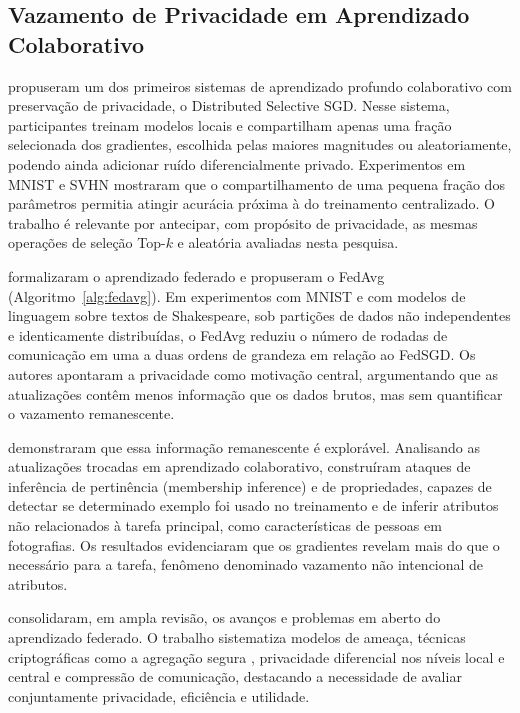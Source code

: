\subsection{Vazamento de Privacidade em Aprendizado Colaborativo}

 propuseram um dos primeiros sistemas de aprendizado profundo colaborativo com preservação de privacidade, o Distributed Selective SGD. Nesse sistema, participantes treinam modelos locais e compartilham apenas uma fração selecionada dos gradientes, escolhida pelas maiores magnitudes ou aleatoriamente, podendo ainda adicionar ruído diferencialmente privado. Experimentos em MNIST e SVHN mostraram que o compartilhamento de uma pequena fração dos parâmetros permitia atingir acurácia próxima à do treinamento centralizado. O trabalho é relevante por antecipar, com propósito de privacidade, as mesmas operações de seleção Top-$k$ e aleatória avaliadas nesta pesquisa.

 formalizaram o aprendizado federado e propuseram o FedAvg (Algoritmo~\ref{alg:fedavg}). Em experimentos com MNIST e com modelos de linguagem sobre textos de Shakespeare, sob partições de dados não independentes e identicamente distribuídas, o FedAvg reduziu o número de rodadas de comunicação em uma a duas ordens de grandeza em relação ao FedSGD. Os autores apontaram a privacidade como motivação central, argumentando que as atualizações contêm menos informação que os dados brutos, mas sem quantificar o vazamento remanescente.

 demonstraram que essa informação remanescente é explorável. Analisando as atualizações trocadas em aprendizado colaborativo, construíram ataques de inferência de pertinência (membership inference) e de propriedades, capazes de detectar se determinado exemplo foi usado no treinamento e de inferir atributos não relacionados à tarefa principal, como características de pessoas em fotografias. Os resultados evidenciaram que os gradientes revelam mais do que o necessário para a tarefa, fenômeno denominado vazamento não intencional de atributos.

 consolidaram, em ampla revisão, os avanços e problemas em aberto do aprendizado federado. O trabalho sistematiza modelos de ameaça, técnicas criptográficas como a agregação segura \cite{Bonawitz2017}, privacidade diferencial nos níveis local e central e compressão de comunicação, destacando a necessidade de avaliar conjuntamente privacidade, eficiência e utilidade.

